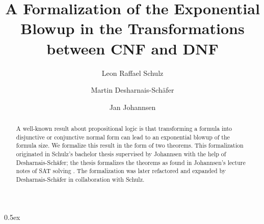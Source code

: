 \documentclass[11pt,a4paper]{article}
\begin{document}
\title{A Formalization of the Exponential Blowup in the Transformations between CNF and DNF}
\author{Leon Raffael Schulz \and Martin Desharnais-Schäfer \and Jan Johannsen}
\maketitle

\begin{abstract}
  A well-known result about propositional logic is that transforming a formula into disjunctive or conjunctive normal form can lead to an exponential blowup of the formula size.
  We formalize this result in the form of two theorems.
  This formalization originated in Schulz’s bachelor thesis \cite{Schulz_bsc_thesis} supervised by Johannsen with the help of Desharnais-Schäfer;
  the thesis formalizes the theorems as found in Johannsen's lecture notes of SAT solving \cite{Johannsen_skript}.
  The formalization was later refactored and expanded by Desharnais-Schäfer in collaboration with Schulz.
\end{abstract}

\tableofcontents

\parindent 0pt\parskip 0.5ex





\end{document}
